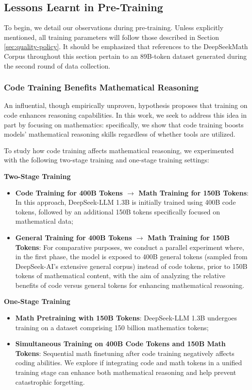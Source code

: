 \begin{itemize}[topsep=0pt]
\begin{itemize}[topsep=0pt]
\subsection{Lessons Learnt in Pre-Training}

To begin, we detail our observations during pre-training. Unless explicitly mentioned, all training parameters will follow those described in Section \ref{sec:quality-policy}. It should be emphasized that references to the DeepSeekMath Corpus throughout this section pertain to an 89B-token dataset generated during the second round of data collection.

\subsubsection{Code Training Benefits Mathematical Reasoning}

An influential, though empirically unproven, hypothesis proposes that training on code enhances reasoning capabilities. In this work, we seek to address this idea in part by focusing on mathematics: specifically, we show that code training boosts models' mathematical reasoning skills regardless of whether tools are utilized.

To study how code training affects mathematical reasoning, we experimented with the following two-stage training and one-stage training settings:

\textbf{Two-Stage Training}

\begin{itemize}[topsep=0pt]
    \item \textbf{Code Training for 400B Tokens $\rightarrow$ Math Training for 150B Tokens}: In this approach, DeepSeek-LLM 1.3B is initially trained using 400B code tokens, followed by an additional 150B tokens specifically focused on mathematical data;
    \item \textbf{General Training for 400B Tokens $\rightarrow$ Math Training for 150B Tokens}: For comparative purposes, we conduct a parallel experiment where, in the first phase, the model is exposed to 400B general tokens (sampled from DeepSeek-AI’s extensive general corpus) instead of code tokens, prior to 150B tokens of mathematical content, with the aim of analyzing the relative benefits of code versus general tokens for enhancing mathematical reasoning.
\end{itemize}

\textbf{One-Stage Training}

\begin{itemize}[topsep=0pt]
    \item \textbf{Math Pretraining with 150B Tokens}: DeepSeek-LLM 1.3B undergoes training on a dataset comprising 150 billion mathematics tokens;
    \item \textbf{Simultaneous Training on 400B Code Tokens and 150B Math Tokens}: Sequential math finetuning after code training negatively affects coding abilities. We explore if integrating code and math tokens in a unified training stage can enhance both mathematical reasoning and help prevent catastrophic forgetting.
\end{itemize}


\end{itemize}
\end{itemize}
